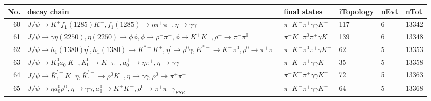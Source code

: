 \begin{table}[htbp] 
\begin{center}
\begin{small}
\begin{tabular}{rlllll}\hline\hline
 No. & decay chain & final states &  iTopology & nEvt & nTot \\\hline
 60&$J/\psi       \rightarrow K^{+}          f_{1}(1285)    K^{-}          , f_{1}(1285)     \rightarrow \eta          \pi^{+}        \pi^{-}        , \eta           \rightarrow \gamma       \gamma       $&$\pi^{-}        K^{-}          \pi^{+}        \gamma       \gamma       K^{+}          $&  117&    6&13342\\
 61&$J/\psi       \rightarrow \gamma       \eta(2250)    , \eta(2250)     \rightarrow \phi           \phi           , \phi            \rightarrow \rho^{-}      \pi^{+}        , \phi            \rightarrow K^{+}          K^{-}          , \rho^{-}       \rightarrow \pi^{-}        \pi^{0}        $&$\pi^{-}        K^{-}          \pi^{0}        \pi^{+}        \gamma       K^{+}          $&  139&    6&13348\\
 62&$J/\psi       \rightarrow h_{1}(1380)    \eta^{\prime} , h_{1}(1380)     \rightarrow K^{*-}         K^{+}          , \eta^{\prime}  \rightarrow \rho^{0}      \gamma       , K^{*-}          \rightarrow K^{-}          \pi^{0}        , \rho^{0}       \rightarrow \pi^{+}        \pi^{-}        $&$\pi^{-}        K^{-}          \pi^{0}        \pi^{+}        \gamma       K^{+}          $&   62&    5&13353\\
 63&$J/\psi       \rightarrow K_0^{0}        a_{0}^{+}      K^{-}          , K_0^{0}         \rightarrow K^{+}          \pi^{-}        , a_{0}^{+}       \rightarrow \eta          \pi^{+}        , \eta           \rightarrow \gamma       \gamma       $&$\pi^{-}        K^{-}          \pi^{+}        \gamma       \gamma       K^{+}          $&   35&    5&13358\\
 64&$J/\psi       \rightarrow \bar{K}_1^{'-}K^{+}          \eta          , \bar{K}_1^{'-} \rightarrow \rho^{0}      K^{-}          , \eta           \rightarrow \gamma       \gamma       , \rho^{0}       \rightarrow \pi^{+}        \pi^{-}        $&$\pi^{-}        K^{-}          \pi^{+}        \gamma       \gamma       K^{+}          $&   72&    5&13363\\
 65&$J/\psi       \rightarrow \eta          a_{0}^{0}      \rho^{0}      , \eta           \rightarrow \gamma       \gamma       , a_{0}^{0}       \rightarrow K^{+}          K^{-}          , \rho^{0}       \rightarrow \pi^{+}        \pi^{-}        \gamma_{FSR} $&$\pi^{-}        K^{-}          \pi^{+}        \gamma       \gamma       K^{+}          $&   64&    5&13368\\

\end{tabular}
\end{small}
\end{center}
\end{table}
